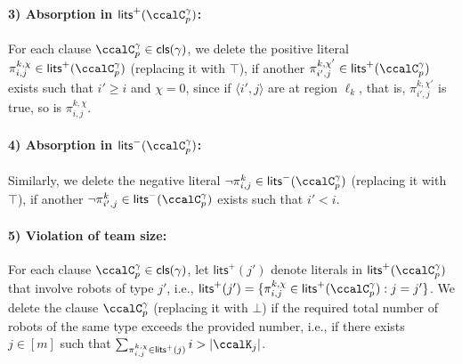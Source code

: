 \documentclass[Afour,sageh,times]{sagej}
\newcommand{\clause}[1]{\mathsf{cls}(#1)}
\newcommand{\cp}[2]{\ccalC_{#1}^{#2}}
\newcommand{\ag}[2]{\langle#1,#2\rangle}
\renewcommand{\ap}[3]{\mathcal{\pi}_{{#1},{#2}}^{#3}}
\begin{document}
{ \paragraph{3) Absorption in $\mathsf{lits}^+(\cp{p}{\gamma})$:} \label{prune:absorption1} For each clause $\cp{p}{\gamma} \in \clause{\gamma}$, we delete the positive literal $\ap{i}{j}{k,\chi} \in \mathsf{lits}^+(\cp{p}{\gamma})$ (replacing it with $\top$), if another $\ap{i'}{j}{k,\chi'} \in \mathsf{lits}^+(\cp{p}{\gamma})$ exists such that $i' \geq i$ and $\chi=0$, since if $\ag{i'}{j}$ are at region $\ell_k$, that is, $\ap{i'}{j}{k,\chi'}$ is true, so is  $\ap{i}{j}{k,\chi}$.%
 \paragraph{4) Absorption in $\mathsf{lits}^-(\cp{p}{\gamma})$:} \label{prune:absorption2} Similarly, we delete the negative literal $\neg \ap{i}{j}{k} \in \mathsf{lits}^-(\cp{p}{\gamma})$ (replacing it with $\top$), if another $\neg \ap{i'}{j}{k} \in \mathsf{lits}^-(\cp{p}{\gamma})$ exists such that $i' < i$.
       \paragraph{5) Violation of team size:} \label{prune:violation1}  For each clause $\cp{p}{\gamma} \in \clause{\gamma}$, let $\mathsf{lits}^+(j')$ denote literals in $\mathsf{lits}^+(\cp{p}{\gamma})$ that involve robots of type $j'$, i.e., $\mathsf{lits}^+(j') = \{\ap{i}{j}{k,\chi} \in \mathsf{lits}^+(\ccalC_p^\gamma): j = j'\}$. We delete the clause $\cp{p}{\gamma}$ (replacing it with $\bot$) if the required total number of robots of the same type exceeds the provided number, i.e., if there exists $j\in[m]$ such that $ \sum_{\ap{i}{j}{k,\chi}\in\mathsf{lits}^+(j)}   i > |\ccalK_{j}|$.
}
\end{document}
